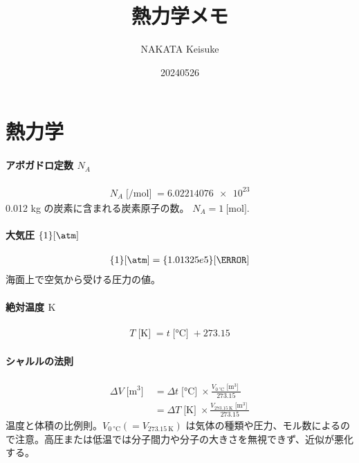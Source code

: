 \documentclass[a4paper,11pt]{jsarticle}
\newcommand{\braunit}[1]{\;\text{[}\unit{#1}\text{]}\;}
\begin{document}
\title{熱力学メモ}
\author{NAKATA Keisuke}
\date{20240526}
\maketitle


\part*{熱力学}

\subsection*{アボガドロ定数 $N_A$}
\begin{align*}
  N_A \braunit{\per\mol}= \num{6.02214076e23}
\end{align*}
0.012 kg の炭素に含まれる炭素原子の数。 $N_A = \qty{1}{[\mol]}$.
\cite[pp.1]{thermo}

\subsection*{大気圧 $\qty{1}{[\atm]}$}
\begin{align*}
  \qty{1}{[\atm]} = \qty{1.01325e5}{[\Pa]}
\end{align*}
海面上で空気から受ける圧力の値。
\cite[pp.1]{thermo}

\subsection*{絶対温度 $\unit{\K}$}
\begin{align*}
  T \braunit{\K} = t \braunit{\celsius} + 273.15
\end{align*}
\cite[pp.10]{thermo}

\subsection*{シャルルの法則}
\begin{align*}
  \varDelta V\braunit{\m^3}
    &= \varDelta t\braunit{\celsius}\times\frac{V_{\qty{0}{\celsius}}\braunit{\m^3}}{273.15} \\
    &= \varDelta T\braunit{\K}\times\frac{V_{\qty{273.15}{\K}}\braunit{\m^3}}{273.15}
\end{align*}
温度と体積の比例則。$V_{\qty{0}{\celsius}} (=V_{\qty{273.15}{\K}})$ は気体の種類や圧力、モル数によるので注意。高圧または低温では分子間力や分子の大きさを無視できず、近似が悪化する。
\cite[pp.10]{thermo}
\end{document}
